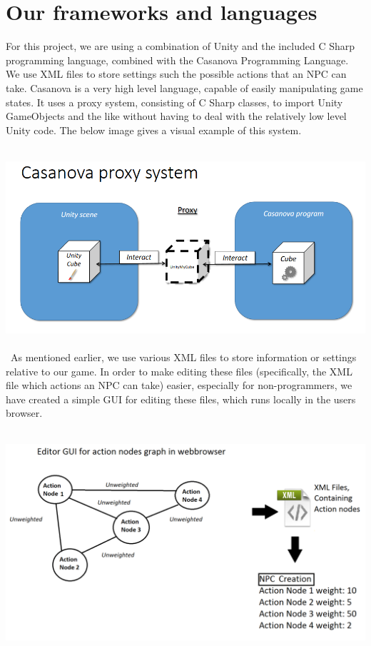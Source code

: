 \documentclass[11pt]{article} %
\begin{document}
\newpage
\section{Our frameworks and languages}
For this project, we are using a combination of Unity and the included C Sharp programming language, combined with the Casanova Programming Language. We use XML files to store settings such the possible actions that an NPC can take.
Casanova is a very high level language, capable of easily manipulating game states. It uses a proxy system, consisting of C Sharp classes, to import Unity GameObjects and the like without having to deal with the relatively low level Unity code. The below image gives a visual example of this system.


~\\
\includegraphics[scale=0.5]{proxySystem}
~\\

\newpage
\
As mentioned earlier, we use various XML files to store information or settings relative to our game. In order to make editing these files (specifically, the XML file which actions an NPC can take) easier, especially for non-programmers, we have created a simple GUI for editing these files, which runs locally in the users browser. 

~\\
\includegraphics[scale=0.3]{XmlSystem}
~\\
\end{document}
